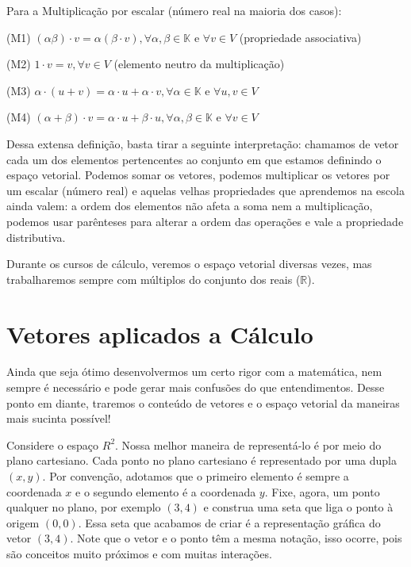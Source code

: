 \documentclass[
  portuguese,
  letterpaper,
  DIV=11,
  numbers=noendperiod]{scrreport}
\begin{document}
Para a Multiplicação por escalar (número real na maioria dos casos):

(M1)
\((\alpha \beta) \cdot v = \alpha (\beta \cdot v), \forall \alpha , \beta \in \mathbb{K} \text{ e } \forall  v \in V\)
(propriedade associativa)

(M2) \(1 \cdot v = v,  \forall v \in V\) (elemento neutro da
multiplicação)

(M3)
\(\alpha \cdot (u+v)=\alpha \cdot u + \alpha \cdot v,  \forall \alpha \in \mathbb{K} \text{ e } \forall u,v \in V\)

(M4)
\((\alpha + \beta) \cdot v = \alpha \cdot u + \beta \cdot u, \forall \alpha, \beta \in \mathbb{K} \text{ e } \forall v \in V\)

Dessa extensa definição, basta tirar a seguinte interpretação: chamamos
de vetor cada um dos elementos pertencentes ao conjunto em que estamos
definindo o espaço vetorial. Podemos somar os vetores, podemos
multiplicar os vetores por um escalar (número real) e aquelas velhas
propriedades que aprendemos na escola ainda valem: a ordem dos elementos
não afeta a soma nem a multiplicação, podemos usar parênteses para
alterar a ordem das operações e vale a propriedade distributiva.

Durante os cursos de cálculo, veremos o espaço vetorial diversas vezes,
mas trabalharemos sempre com múltiplos do conjunto dos reais
(\(\mathbb{R}\)).

\section{Vetores aplicados a
Cálculo}\label{vetores-aplicados-a-cuxe1lculo}

Ainda que seja ótimo desenvolvermos um certo rigor com a matemática, nem
sempre é necessário e pode gerar mais confusões do que entendimentos.
Desse ponto em diante, traremos o conteúdo de vetores e o espaço
vetorial da maneiras mais sucinta possível!

Considere o espaço \(R^2\). Nossa melhor maneira de representá-lo é por
meio do plano cartesiano. Cada ponto no plano cartesiano é representado
por uma dupla \((x, y)\). Por convenção, adotamos que o primeiro
elemento é sempre a coordenada \(x\) e o segundo elemento é a coordenada
\(y\). Fixe, agora, um ponto qualquer no plano, por exemplo \((3,4)\) e
construa uma seta que liga o ponto à origem \((0,0)\). Essa seta que
acabamos de criar é a representação gráfica do vetor \((3,4)\). Note que
o vetor e o ponto têm a mesma notação, isso ocorre, pois são conceitos
muito próximos e com muitas interações.
\end{document}
